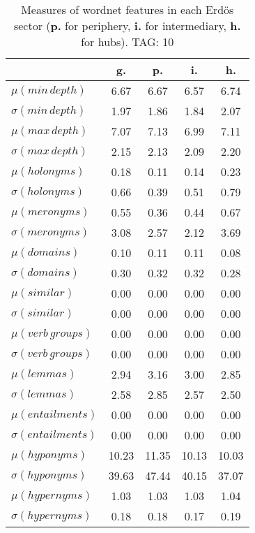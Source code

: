 \begin{table}[h!]
\begin{center}
\begin{tabular}{| l || c | c | c | c |}\hline
 & {\bf g.} & {\bf p.} & {\bf i.} & {\bf h.} \\\hline\hline
$\mu(min\,depth)$ & 6.67  & 6.67  & 6.57  & 6.74 \\
$\sigma(min\,depth)$ & 1.97  & 1.86  & 1.84  & 2.07 \\\hline
$\mu(max\,depth)$ & 7.07  & 7.13  & 6.99  & 7.11 \\
$\sigma(max\,depth)$ & 2.15  & 2.13  & 2.09  & 2.20 \\\hline
$\mu(holonyms)$ & 0.18  & 0.11  & 0.14  & 0.23 \\
$\sigma(holonyms)$ & 0.66  & 0.39  & 0.51  & 0.79 \\\hline
$\mu(meronyms)$ & 0.55  & 0.36  & 0.44  & 0.67 \\
$\sigma(meronyms)$ & 3.08  & 2.57  & 2.12  & 3.69 \\\hline
$\mu(domains)$ & 0.10  & 0.11  & 0.11  & 0.08 \\
$\sigma(domains)$ & 0.30  & 0.32  & 0.32  & 0.28 \\\hline
$\mu(similar)$ & 0.00  & 0.00  & 0.00  & 0.00 \\
$\sigma(similar)$ & 0.00  & 0.00  & 0.00  & 0.00 \\\hline
$\mu(verb\,groups)$ & 0.00  & 0.00  & 0.00  & 0.00 \\
$\sigma(verb\,groups)$ & 0.00  & 0.00  & 0.00  & 0.00 \\\hline
$\mu(lemmas)$ & 2.94  & 3.16  & 3.00  & 2.85 \\
$\sigma(lemmas)$ & 2.58  & 2.85  & 2.57  & 2.50 \\\hline
$\mu(entailments)$ & 0.00  & 0.00  & 0.00  & 0.00 \\
$\sigma(entailments)$ & 0.00  & 0.00  & 0.00  & 0.00 \\\hline
$\mu(hyponyms)$ & 10.23  & 11.35  & 10.13  & 10.03 \\
$\sigma(hyponyms)$ & 39.63  & 47.44  & 40.15  & 37.07 \\\hline
$\mu(hypernyms)$ & 1.03  & 1.03  & 1.03  & 1.04 \\
$\sigma(hypernyms)$ & 0.18  & 0.18  & 0.17  & 0.19 \\\hline
\end{tabular}
\caption{Measures of wordnet features in each Erd\"os sector ({{\bf p.}} for periphery, {{\bf i.}} for intermediary, {{\bf h.}} for hubs). TAG: 10}
\end{center}
\end{table}